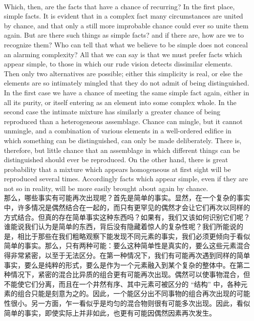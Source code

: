 \documentclass{article}
\begin{document}
\\
Which, then, are the facts that have a chance of recurring? In the first place, simple facts. It is evident that in a complex fact many circumstances are united by chance, and that only a still more improbable chance could ever so unite them again. But are there such things as simple facts? and if there are, how are we to recognize them? Who can tell that what we believe to be simple does not conceal an alarming complexity? All that we can say is that we must prefer facts which appear simple, to those in which our rude vision detects dissimilar elements. Then only two alternatives are possible; either this simplicity is real, or else the elements are so intimately mingled that they do not admit of being distinguished. In the first case we have a chance of meeting the same simple fact again, either in all its purity, or itself entering as an element into some complex whole. In the second case the intimate mixture has similarly a greater chance of being reproduced than a heterogeneous assemblage. Chance can mingle, but it cannot unmingle, and a combination of various elements in a well-ordered edifice in which something can be distinguished, can only be made deliberately. There is, therefore, but little chance that an assemblage in which different things can be distinguished should ever be reproduced. On the other hand, there is great probability that a mixture which appears homogeneous at first sight will be reproduced several times. Accordingly facts which appear simple, even if they are not so in reality, will be more easily brought about again by chance.\\
那么，哪些事实有可能再次出现呢？首先是简单的事实。显然，在一个复杂的事实中，许多情况是偶然结合在一起的，而只有更罕见的偶然才会让它们再次以同样的方式结合。但真的存在简单事实这种东西吗？如果有，我们又该如何识别它们呢？谁能说我们认为是简单的东西，背后没有隐藏着惊人的复杂性呢？我们所能说的是，相比于那些在我们粗略观察下能发现不同元素的事实，我们必须更倾向于看似简单的事实。那么，只有两种可能：要么这种简单性是真实的，要么这些元素混合得非常紧密，以至于无法区分。在第一种情况下，我们有可能再次遇到同样的简单事实，要么是纯粹的形式，要么是作为一个元素融入到某个复杂的整体中。在第二种情况下，紧密的混合比异质的组合更有可能再次出现。偶然可以使事物混合，但不能使它们分离，而且在一个井然有序、其中元素可被区分的 “结构” 中，各种元素的组合只能是刻意为之的。因此，一个能区分出不同事物的组合再次出现的可能性很小。另一方面，乍一看似乎是均匀的混合物则很有可能多次出现。因此，看似简单的事实，即使实际上并非如此，也更有可能因偶然因素再次发生。 \\
\end{document}
